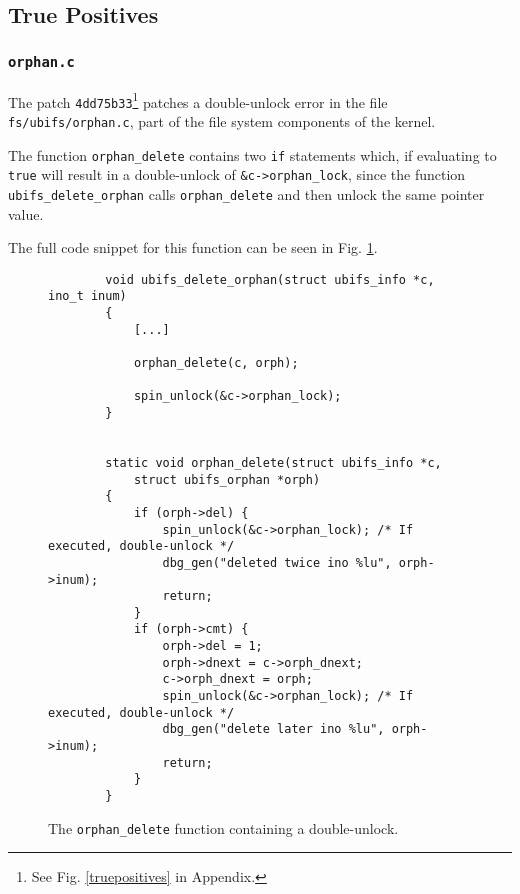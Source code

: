 \subsection{True Positives}

\subsubsection{\texttt{orphan.c}}

\newpar The patch \texttt{4dd75b33}\footnote{See Fig. \ref{truepositives} in Appendix.} patches a double-unlock error in the file \texttt{fs/ubifs/orphan.c}, part of the file system components of the kernel.

\newpar The function \texttt{orphan\_delete} contains two \texttt{if} statements which, if evaluating to \texttt{true} will result in a double-unlock of \texttt{\&c->orphan\_lock}, since the function \texttt{ubifs\_delete\_orphan} calls \texttt{orphan\_delete} and then unlock the same pointer value. 

\newpar The full code snippet for this function can be seen in Fig. \ref{fig:orphan.c}.

\begin{figure}[H]
    \centering
    \begin{verbatim}
        void ubifs_delete_orphan(struct ubifs_info *c, ino_t inum)
        {
            [...]
            
            orphan_delete(c, orph);

            spin_unlock(&c->orphan_lock);
        }


        static void orphan_delete(struct ubifs_info *c, 
            struct ubifs_orphan *orph)
        {
            if (orph->del) {
                spin_unlock(&c->orphan_lock); /* If executed, double-unlock */
                dbg_gen("deleted twice ino %lu", orph->inum);
                return;
            }
            if (orph->cmt) {
                orph->del = 1;
                orph->dnext = c->orph_dnext;
                c->orph_dnext = orph;
                spin_unlock(&c->orphan_lock); /* If executed, double-unlock */
                dbg_gen("delete later ino %lu", orph->inum);
                return;
            }
        }
    \end{verbatim}
    \caption{The \texttt{orphan\_delete} function containing a double-unlock.}
    \label{fig:orphan.c}
\end{figure}